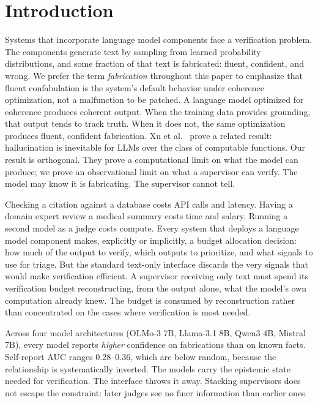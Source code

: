 \section{Introduction}\label{sec:intro}

Systems that incorporate language model components face a verification problem.
The components generate text by sampling from learned probability distributions,
and some fraction of that text is fabricated: fluent, confident, and wrong. We
prefer the term \emph{fabrication} throughout this paper to emphasize that
fluent confabulation is the system's default behavior under coherence
optimization, not a malfunction to be patched. A language model optimized for
coherence produces coherent output. When the training data provides grounding,
that output tends to track truth. When it does not, the same optimization
produces fluent, confident fabrication. Xu et
al.~\cite{xu2024hallucination} prove a related result: hallucination is
inevitable for LLMs over the class of computable functions. Our result is
orthogonal. They prove a computational limit on what the model can produce;
we prove an observational limit on what a supervisor can verify. The model may
know it is fabricating. The supervisor cannot tell.

Checking a citation against a database costs API calls and latency. Having a
domain expert review a medical summary costs time and salary. Running a second
model as a judge costs compute. Every system that deploys a language model
component makes, explicitly or implicitly, a budget allocation decision: how
much of the output to verify, which outputs to prioritize, and what signals to
use for triage. But the standard text-only interface discards the very signals
that would make verification efficient. A supervisor receiving only text must
spend its verification budget reconstructing, from the output alone, what the
model's own computation already knew. The budget is consumed by reconstruction
rather than concentrated on the cases where verification is most needed.

Across four model architectures (OLMo-3 7B, Llama-3.1 8B, Qwen3 4B,
Mistral 7B), every model reports \emph{higher} confidence on fabrications than
on known facts. Self-report AUC ranges 0.28--0.36, which are below random, because the
relationship is systematically inverted. The models carry the epistemic state
needed for verification. The interface throws it away. Stacking supervisors
does not escape the constraint: later judges see no finer information than
earlier ones.


